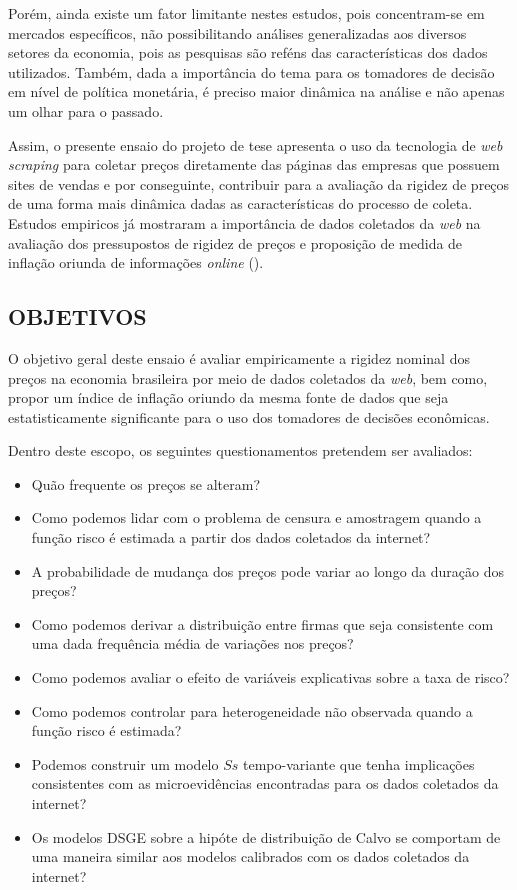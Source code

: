 \documentclass[twoside,a4paper,11pt]{report}
\begin{document}
Porém, ainda existe um fator limitante nestes estudos, pois concentram-se em mercados específicos, não possibilitando análises generalizadas aos diversos setores da economia, pois as pesquisas são reféns das características dos dados utilizados. Também, dada a importância do tema para os tomadores de decisão em nível de política monetária, é preciso maior dinâmica na análise e não apenas um olhar para o passado. 

Assim, o presente ensaio do projeto de tese apresenta o uso da tecnologia de \emph{web scraping} para coletar preços diretamente das páginas das empresas que possuem sites de vendas e por conseguinte, contribuir para a avaliação da rigidez de preços de uma forma mais dinâmica dadas as características do processo de coleta. Estudos empiricos já mostraram a importância de dados coletados da \emph{web} na avaliação dos pressupostos de rigidez de preços e proposição de medida de inflação oriunda de informações \emph{online} (\citet{cavallo2010scraped}).

\subsection*{OBJETIVOS}

O objetivo geral deste ensaio é avaliar empiricamente a rigidez nominal dos preços na economia brasileira por meio de dados coletados da \emph{web}, bem como, propor um índice de inflação oriundo da mesma fonte de dados que seja estatisticamente significante para o uso dos tomadores de decisões econômicas.

Dentro deste escopo, os seguintes questionamentos pretendem ser avaliados:

\begin{itemize}
  \item Quão frequente os preços se alteram?
  \item Como podemos lidar com o problema de censura e amostragem quando a função risco é estimada a partir dos dados coletados da internet?
  \item A probabilidade de mudança dos preços pode variar ao longo da duração dos preços?
  \item Como podemos derivar a distribuição entre firmas que seja consistente com uma dada frequência média de variações nos preços?
  \item Como podemos avaliar o efeito de variáveis explicativas sobre a taxa de risco?
  \item Como podemos controlar para heterogeneidade não observada quando a função risco é estimada?
  \item Podemos construir um modelo $Ss$ tempo-variante que tenha implicações consistentes com as microevidências encontradas para os dados coletados da internet?
  \item Os modelos DSGE sobre a hipóte de distribuição de Calvo se comportam de uma maneira similar aos modelos calibrados com os dados coletados da internet?
\end{itemize}
\end{document}
